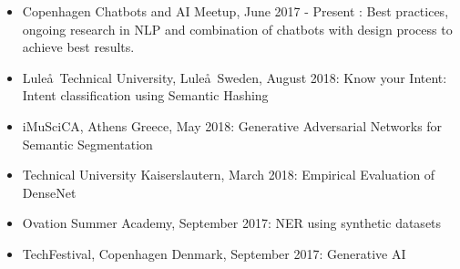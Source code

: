 \documentclass[10pt,letterpaper]{article}
\begin{document}
\begin{itemize}
	\parskip=0.1em
	
	\item {\color{BrickRed} Copenhagen Chatbots and AI Meetup}, June 2017 - Present : Best practices, ongoing research in NLP and combination of chatbots with design process to achieve best results.
	
	\item {\color{BrickRed} Lule\aa\ Technical University}, Lule\aa\ Sweden, August 2018: Know your Intent: Intent classification using Semantic Hashing
	
	\item {\color{BrickRed} iMuSciCA}, Athens Greece, May 2018: Generative Adversarial Networks for Semantic Segmentation 
	\item {\color{BrickRed} Technical University Kaiserslautern}, March 2018: Empirical Evaluation of DenseNet 
		
	\item {\color{BrickRed} Ovation Summer Academy}, September 2017: NER using synthetic datasets 
	
	\item {\color{BrickRed} TechFestival}, Copenhagen Denmark, September 2017: Generative AI 
	

	
	
\end{itemize}
\end{document}
